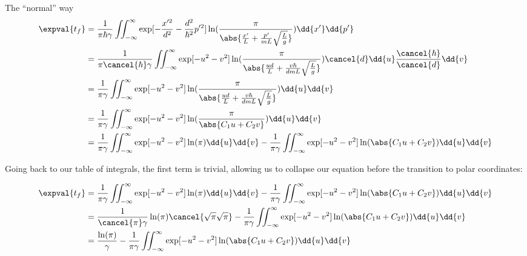\begin{answer}
\begin{answerpart}{The ``normal'' way}
    \begin{equation}
      \begin{split}
        \expval{t_f}
        &=
        \frac{1}{\pi\hbar\gamma}
        \iint_{-\infty}^{\infty}
        \exp[-\frac{x'^{2}}{d^2} - \frac{d^2}{\hbar^2}p'^2]
        \ln(\frac{\pi}{\abs{\frac{x'}{L} + \frac{p'}{mL}\sqrt{\frac{L}{g}}}})
        \dd{x'} \dd{p'}
        \\
        &=
        \frac{1}{\pi\cancel{\hbar}\gamma}
        \iint_{-\infty}^{\infty}
        \exp[-u^2 - v^2]
        \ln(\frac{\pi}{\abs{\frac{ud}{L} + \frac{v\hbar}{dmL}\sqrt{\frac{L}{g}}}})
        \cancel{d} \dd{u}
        \frac{\cancel{\hbar}}{\cancel{d}} \dd{v}
        \\
        &=
        \frac{1}{\pi\gamma}
        \iint_{-\infty}^{\infty}
        \exp[-u^2 - v^2]
        \ln(\frac{\pi}{\abs{\frac{ud}{L} + \frac{v\hbar}{dmL}\sqrt{\frac{L}{g}}}})
        \dd{u} \dd{v}
        \\
        &=
        \frac{1}{\pi\gamma}
        \iint_{-\infty}^{\infty}
        \exp[-u^2 - v^2]
        \ln(\frac{\pi}{\abs{C_1u + C_2v}})
        \dd{u} \dd{v}
        \\
        &=
        \frac{1}{\pi\gamma}
        \iint_{-\infty}^{\infty}
        \exp[-u^2 - v^2]
        \ln(\pi)
        \dd{u} \dd{v}
        - 
        \frac{1}{\pi\gamma}
        \iint_{-\infty}^{\infty}
        \exp[-u^2 - v^2]
        \ln(\abs{C_1u + C_2v})
        \dd{u} \dd{v}
        \\
      \end{split}
    \end{equation}

    Going back to our table of integrals, the first term is trivial,
    allowing us to collapse our equation before the transition to
    polar coordinates:

    
    \begin{equation}
      \begin{split}
        \expval{t_f}
        &=
        \frac{1}{\pi\gamma}
        \iint_{-\infty}^{\infty}
        \exp[-u^2 - v^2]
        \ln(\pi)
        \dd{u} \dd{v}
        - 
        \frac{1}{\pi\gamma}
        \iint_{-\infty}^{\infty}
        \exp[-u^2 - v^2]
        \ln(\abs{C_1u + C_2v})
        \dd{u} \dd{v}
        \\
        &=
        \frac{1}{\cancel{\pi}\gamma}
        \ln(\pi)
        \cancel{\sqrt{\pi}\sqrt{\pi}}
        - 
        \frac{1}{\pi\gamma}
        \iint_{-\infty}^{\infty}
        \exp[-u^2 - v^2]
        \ln(\abs{C_1u + C_2v})
        \dd{u} \dd{v}
        \\
        &=
        \frac{\ln(\pi)}{\gamma}
        - 
        \frac{1}{\pi\gamma}
        \iint_{-\infty}^{\infty}
        \exp[-u^2 - v^2]
        \ln(\abs{C_1u + C_2v})
        \dd{u} \dd{v}
        \\
      \end{split}
    \end{equation}


\end{answerpart}
\end{answer}
